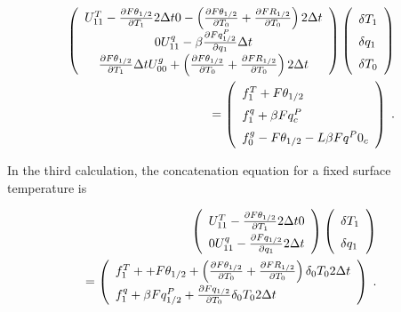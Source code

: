 \begin{eqnarray}
 \renewcommand{\arraystretch}{1.5}
  \left( \begin{array}{ccc}
      U_{11}^T - \frac{\partial F\theta_{1/2}}{\partial T_1} 2 \Delta t
      0
      - \left( \frac{\partial F\theta_{1/2}}{\partial T_0}
                         + \frac{\partial FR_{1/2}}{\partial T_0}\right) 2 \Delta t \\
      0
      U_{11}^q - \beta \frac{\partial Fq^P_{1/2}}{\partial q_1} \Delta t  \\
        \frac{\partial F\theta_{1/2}}{\partial T_1} \Delta t  
      U_{00}^g + \left(\frac{\partial F\theta_{1/2}}{\partial T_0}
                + \frac{\partial FR_{1/2}}{\partial T_0} \right) 2 \Delta t \\
  \end{array} \right)
  \left( \begin{array}{l}
      \delta T_1 \\ \delta q_1 \\ \delta T_0 \\
  \end{array} \right)   \\
=
  \left( \begin{array}{l}
      f_1^T + F\theta_{1/2} \\  
      f_1^q + \beta Fq^P_c \\  
      f_0^g - F\theta_{1/2} - L \beta Fq^P0_c \\  
  \end{array} \right) \; .
\end{eqnarray}

In the third calculation, the concatenation equation for a fixed surface
temperature is

\begin{eqnarray}
 \renewcommand{\arraystretch}{1.5}
  \left( \begin{array}{cc}
      U_{11}^T - \frac{\partial F\theta_{1/2}}{\partial T_1} 2 \Delta t
      0 \\
      0
      U_{11}^q - \frac{\partial Fq_{1/2}}{\partial q_1} 2 \Delta t \\
  \end{array} \right)
  \left( \begin{array}{l}
      \delta T_1 \\ \delta q_1 \\
  \end{array} \right)  \\
=
  \left( \begin{array}{l}
      f_1^T + + F\theta_{1/2}
      + \left( \frac{\partial F\theta_{1/2}}{\partial T_0}
                    + \frac{\partial FR_{1/2}}{\partial T_0} \right) \delta_0 T_0 2 \Delta t \\
      f_1^q +  \beta Fq^P_{1/2}
      + \frac{\partial Fq_{1/2}}{\partial T_0} \delta_0 T_0 2 \Delta t \\
  \end{array} \right) \; .
\end{eqnarray}

